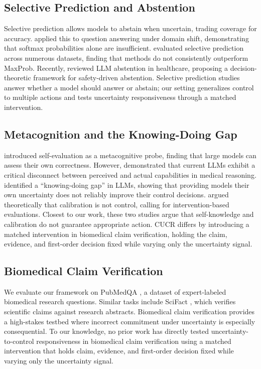 \documentclass[11pt]{article}
\begin{document}
\subsection{Selective Prediction and Abstention}
Selective prediction \citep{geifman2017selective} allows models to abstain when uncertain, trading coverage for accuracy. \citet{kamath2020selective} applied this to question answering under domain shift, demonstrating that softmax probabilities alone are insufficient. \citet{varshney2022investigating} evaluated selective prediction across numerous datasets, finding that methods do not consistently outperform MaxProb. Recently, \citet{presacan2026when} reviewed LLM abstention in healthcare, proposing a decision-theoretic framework for safety-driven abstention. Selective prediction studies answer whether a model should answer or abstain; our setting generalizes control to multiple actions and tests uncertainty responsiveness through a matched intervention.

\subsection{Metacognition and the Knowing-Doing Gap}
\citet{kadavath2022language} introduced self-evaluation as a metacognitive probe, finding that large models can assess their own correctness. However, \citet{griot2025large} demonstrated that current LLMs exhibit a critical disconnect between perceived and actual capabilities in medical reasoning. \citet{wang2026mirror} identified a ``knowing-doing gap'' in LLMs, showing that providing models their own uncertainty does not reliably improve their control decisions. \citet{zhang2026calibration} argued theoretically that calibration is not control, calling for intervention-based evaluations. Closest to our work, these two studies argue that self-knowledge and calibration do not guarantee appropriate action. CUCR differs by introducing a matched intervention in biomedical claim verification, holding the claim, evidence, and first-order decision fixed while varying only the uncertainty signal.

\subsection{Biomedical Claim Verification}
We evaluate our framework on PubMedQA \citep{jin2019pubmedqa}, a dataset of expert-labeled biomedical research questions. Similar tasks include SciFact \citep{wadden2020fact}, which verifies scientific claims against research abstracts. Biomedical claim verification provides a high-stakes testbed where incorrect commitment under uncertainty is especially consequential. To our knowledge, no prior work has directly tested uncertainty-to-control responsiveness in biomedical claim verification using a matched intervention that holds claim, evidence, and first-order decision fixed while varying only the uncertainty signal.
\end{document}
